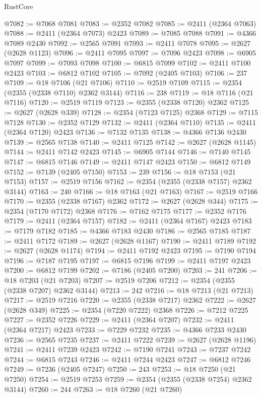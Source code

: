 \begin{lexlean}{RustCore}
\begin{coremodule}
@7082 := @7068 @7081
@7083 := @2352 @7082
@7085 := @2411 (@2364 @7063)
@7088 := @2411 (@2364 @7073) @2423
@7089 := @7085 @7088
@7091 := @4366 @7089 @2430
@7092 := @2565 @7091
@7093 := @2411 @7078
@7095 := @2627 (@2628 @1123)
@7096 := @2411 @7095
@7097 := @7096 @2423
@7098 := @6905 @7097
@7099 := @7093 @7098
@7100 := @6815 @7099
@7102 := @2411 @7100 @2423
@7103 := @6812 @7102
@7105 := @7092 (@2405 @7103)
@7106 := 237
@7109 := @18 @7106 (@21 @7106)
@7110 := @2519 @7109
@7115 := @2354 (@2355 (@2338 @7110) @2362 @3144)
@7116 := 238
@7119 := @18 @7116 (@21 @7116)
@7120 := @2519 @7119
@7123 := @2355 (@2338 @7120) @2362
@7125 := @2627 (@2628 @339)
@7128 := @2354 (@7123 @7125) @2368
@7129 := @7115 @7128
@7130 := @2352 @7129
@7132 := @2411 (@2364 @7110)
@7135 := @2411 (@2364 @7120) @2423
@7136 := @7132 @7135
@7138 := @4366 @7136 @2430
@7139 := @2565 @7138
@7140 := @2411 @7125
@7142 := @2627 (@2628 @1145)
@7144 := @2411 @7142 @2423
@7145 := @6905 @7144
@7146 := @7140 @7145
@7147 := @6815 @7146
@7149 := @2411 @7147 @2423
@7150 := @6812 @7149
@7152 := @7139 (@2405 @7150)
@7153 := 239
@7156 := @18 @7153 (@21 @7153)
@7157 := @2519 @7156
@7162 := @2354 (@2355 (@2338 @7157) @2362 @3144)
@7163 := 240
@7166 := @18 @7163 (@21 @7163)
@7167 := @2519 @7166
@7170 := @2355 (@2338 @7167) @2362
@7172 := @2627 (@2628 @344)
@7175 := @2354 (@7170 @7172) @2368
@7176 := @7162 @7175
@7177 := @2352 @7176
@7179 := @2411 (@2364 @7157)
@7182 := @2411 (@2364 @7167) @2423
@7183 := @7179 @7182
@7185 := @4366 @7183 @2430
@7186 := @2565 @7185
@7187 := @2411 @7172
@7189 := @2627 (@2628 @1167)
@7190 := @2411 @7189
@7192 := @2627 (@2628 @1174)
@7194 := @2411 @7192 @2423
@7195 := @7190 @7194
@7196 := @7187 @7195
@7197 := @6815 @7196
@7199 := @2411 @7197 @2423
@7200 := @6812 @7199
@7202 := @7186 (@2405 @7200)
@7203 := 241
@7206 := @18 @7203 (@21 @7203)
@7207 := @2519 @7206
@7212 := @2354 (@2355 (@2338 @7207) @2362 @3144)
@7213 := 242
@7216 := @18 @7213 (@21 @7213)
@7217 := @2519 @7216
@7220 := @2355 (@2338 @7217) @2362
@7222 := @2627 (@2628 @349)
@7225 := @2354 (@7220 @7222) @2368
@7226 := @7212 @7225
@7227 := @2352 @7226
@7229 := @2411 (@2364 @7207)
@7232 := @2411 (@2364 @7217) @2423
@7233 := @7229 @7232
@7235 := @4366 @7233 @2430
@7236 := @2565 @7235
@7237 := @2411 @7222
@7239 := @2627 (@2628 @1196)
@7241 := @2411 @7239 @2423
@7242 := @7190 @7241
@7243 := @7237 @7242
@7244 := @6815 @7243
@7246 := @2411 @7244 @2423
@7247 := @6812 @7246
@7249 := @7236 (@2405 @7247)
@7250 := 243
@7253 := @18 @7250 (@21 @7250)
@7254 := @2519 @7253
@7259 := @2354 (@2355 (@2338 @7254) @2362 @3144)
@7260 := 244
@7263 := @18 @7260 (@21 @7260)

\end{coremodule}
\end{lexlean}
